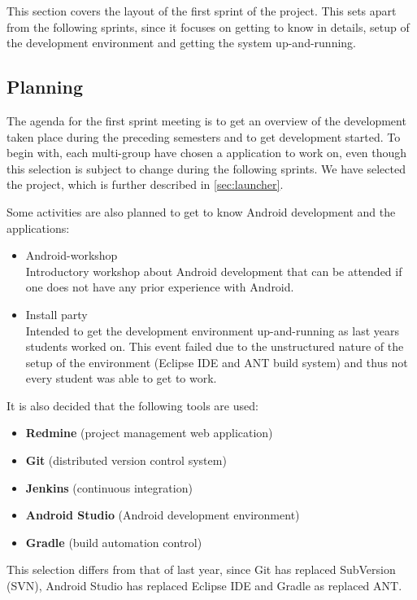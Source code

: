 This section covers the layout of the first sprint of the project.
This sets apart from the following sprints, since it focuses on getting to know \giraf in details, setup of the development environment and getting the system up-and-running.

\subsection{Planning}\label{sec:sprint1:planning}
The agenda for the first sprint meeting is to get an overview of the development taken place during the preceding semesters and to get development started.
To begin with, each multi-group have chosen a \giraf application to work on, even though this selection is subject to change during the following sprints.
We have selected the \launcher project, which is further described in \cref{sec:launcher}.

Some activities are also planned to get to know Android development and the \giraf applications:

\begin{itemize}
\item Android-workshop\\
Introductory workshop about Android development that can be attended if one does not have any prior experience with Android.
\item Install party\\
Intended to get the \giraf development environment up-and-running as last years students worked on. 
This event failed due to the unstructured nature of the setup of the environment (Eclipse IDE and ANT build system) and thus not every student was able to get \giraf to work.
\end{itemize}

It is also decided that the following tools are used:

\begin{itemize}
\item \textbf{Redmine} (project management web application)
\item \textbf{Git} (distributed version control system)
\item \textbf{Jenkins} (continuous integration)
\item \textbf{Android Studio} (Android development environment)
\item \textbf{Gradle} (build automation control)
\end{itemize}

This selection differs from that of last year, since Git has replaced SubVersion (SVN), Android Studio has replaced Eclipse IDE and Gradle as replaced ANT.

